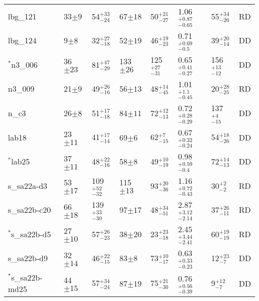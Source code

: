 \documentclass[fleqn,usenatbib]{mnras}
\begin{document}
\begin{table*}
\begin{threeparttable}
\begin{tabular}{llllllll}
lbg\_121        & 33$\pm9$           & 54$^{+33}_{-24}$                     & 67$\pm18$                 & 50$^{+21}_{-27}$                  & 1.06$^{+0.87}_{-0.65}$                & 55$^{+34}_{-26}$  & RD   \\[1ex]
lbg\_124         & 9$\pm8$                    & 32$^{+27}_{-18}$                    & 52$\pm19$                 & 46$^{+19}_{-23}$       & 0.71$^{+0.69}_{-0.5}$               & 39$^{+20}_{-14}$ & DD \\[1ex]
$^{*}$n3\_006         & 36$\pm23$                    & 81$^{+47}_{-29}$                     & 133$\pm26$                 & 125$^{+27}_{-31}$          & 0.65$^{+0.41}_{-0.27}$                & 156$^{+13}_{-12}$ & DD   \\[1ex]
n3\_009         & 21$\pm9$                    & 49$^{+26}_{-16}$                     & 56$\pm13$                  & 48$^{+14}_{-45}$          & 1.01$^{+1.1}_{-0.45}$                & 20$^{+28}_{-25}$  & RD   \\[1ex]
n\_c3           & 26$\pm8$                    & 51$^{+17}_{-18}$                     & 84$\pm11$                  & 72$^{+12}_{-13}$          & 0.72$^{+0.28}_{-0.29}$                & 137$^{+4}_{-15}$  & DD  \\[1ex]
lab18           & 23$\pm11$                   & 41$^{+17}_{-14}$                     & 69$\pm6$                  & 62$^{+7}_{-15}$           & 0.67$^{+0.32}_{-0.24}$                 & 54$^{+18}_{-26}$ & DD    \\[1ex]
$^{*}$lab25           & 37$\pm11$                    & 48$^{+22}_{-16}$                     & 58$\pm8$                  & 49$^{+10}_{-19}$          & 0.98$^{+0.59}_{-0.4}$                & 72$^{+14}_{-13}$ & DD   \\[1ex]
s\_sa22a-d3     & 53$\pm17$                    & 109$^{+52}_{-32}$                    & 115$\pm13$                 & 93$^{+20}_{-36}$          & 1.16$^{+0.72}_{-0.43}$               & 30$^{+2}_{-2}$ & RD    \\[1ex]
s\_sa22b-c20    & 66$\pm18$                    & 139$^{+33}_{-30}$                    & 97$\pm17$                 & 48$^{+34}_{-51}$          & 2.87$^{+3.12}_{-2.14}$                & 37$^{+26}_{-11}$ & RD   \\[1ex]
$^{*}$s\_sa22b-d5     & 27$\pm10$                    & 57$^{+26}_{-23}$                     & 38$\pm20$                  & 23$^{+23}_{-18}$          & 2.45$^{+3.44}_{-2.41}$               & 60$^{+19}_{-19}$ & RD   \\[1ex]
s\_sa22b-d9     & 32$\pm14$                    & 46$^{+22}_{-15}$                     & 83$\pm8$                  & 73$^{+10}_{-17}$             & 0.63$^{+0.33}_{-0.23}$                 & 12$^{+23}_{-7}$ & DD   \\[1ex]
$^{*}$s\_sa22b-md25   & 44$\pm15$           & 57$^{+34}_{-24}$                     & 87$\pm19$   & 75$^{+21}_{-30}$                   & 0.76$^{+0.56}_{-0.39}$                & 9$^{+12}_{-7}$ & DD


\end{tabular}
\end{threeparttable}
\end{table*}
\end{document}
